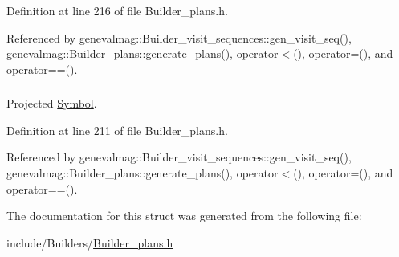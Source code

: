 Definition at line 216 of file Builder\_\-plans.h.



Referenced by genevalmag::Builder\_\-visit\_\-sequences::gen\_\-visit\_\-seq(), genevalmag::Builder\_\-plans::generate\_\-plans(), operator$<$(), operator=(), and operator==().

\hypertarget{structgenevalmag_1_1k__p__project_a64f5efd91847bd333263c799360dd0b5}{
\subsubsection[{symbol\_\-project}]{}}
\label{structgenevalmag_1_1k__p__project_a64f5efd91847bd333263c799360dd0b5}


Projected \hyperlink{classgenevalmag_1_1Symbol}{Symbol}. 



Definition at line 211 of file Builder\_\-plans.h.



Referenced by genevalmag::Builder\_\-visit\_\-sequences::gen\_\-visit\_\-seq(), genevalmag::Builder\_\-plans::generate\_\-plans(), operator$<$(), operator=(), and operator==().



The documentation for this struct was generated from the following file:\begin{DoxyCompactItemize}
\item 
include/Builders/\hyperlink{Builder__plans_8h}{Builder\_\-plans.h}\end{DoxyCompactItemize}
